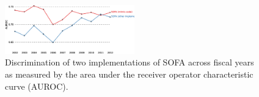 \documentclass{bioinfo}
\begin{document}
\begin{methods}










\begin{figure}[!tpb]%
\centerline{\includegraphics[width=0.5\textwidth]{SOFA.eps}}
\caption{Discrimination of two implementations of SOFA across fiscal years as measured by the area under the receiver operator characteristic curve (AUROC).}\label{fig:SevScoresOverTime}
\end{figure}



\end{methods}
\end{document}
